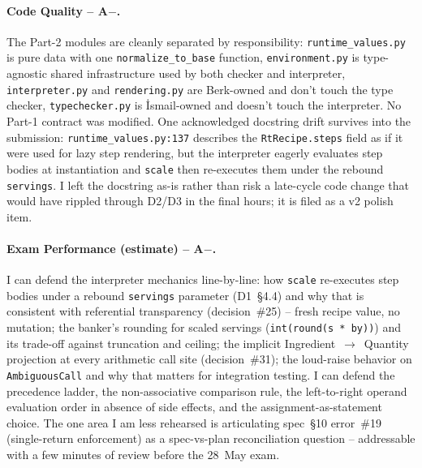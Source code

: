 \documentclass[11pt,a4paper]{article}
\begin{document}
\paragraph{Code Quality -- A$-$.} The Part-2 modules are cleanly
separated by responsibility: \texttt{runtime\_values.py} is pure data
with one \texttt{normalize\_to\_base} function,
\texttt{environment.py} is type-agnostic shared infrastructure used by
both checker and interpreter, \texttt{interpreter.py} and
\texttt{rendering.py} are Berk-owned and don't touch the type checker,
\texttt{typechecker.py} is İsmail-owned and doesn't touch the
interpreter. No Part-1 contract was modified. One acknowledged
docstring drift survives into the submission: \texttt{runtime\_values.py:137}
describes the \texttt{RtRecipe.steps} field as if it were used for
lazy step rendering, but the interpreter eagerly evaluates step
bodies at instantiation and \texttt{scale} then re-executes them under
the rebound \texttt{servings}. I left the docstring as-is rather than
risk a late-cycle code change that would have rippled through D2/D3
in the final hours; it is filed as a v2 polish item.

\paragraph{Exam Performance (estimate) -- A$-$.} I can defend the
interpreter mechanics line-by-line: how \texttt{scale} re-executes
step bodies under a rebound \texttt{servings} parameter
(D1~\S4.4) and why that is consistent with referential transparency
(decision~\#25) -- fresh recipe value, no mutation; the banker's
rounding for scaled servings (\texttt{int(round(s * by))}) and its
trade-off against truncation and ceiling; the implicit
Ingredient~$\to$~Quantity projection at every arithmetic call site
(decision~\#31); the loud-raise behavior on \texttt{AmbiguousCall} and
why that matters for integration testing. I can defend the
precedence ladder, the non-associative comparison rule, the
left-to-right operand evaluation order in absence of side effects,
and the assignment-as-statement choice. The one area I am less
rehearsed is articulating spec~\S10 error~\#19 (single-return
enforcement) as a spec-vs-plan reconciliation question --
addressable with a few minutes of review before the 28~May exam.
\end{document}
